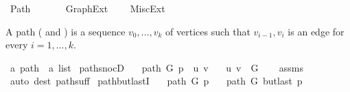 %
\begin{isabellebody}%
%
%
\isadelimtheory
%
\endisadelimtheory
%
\isatagtheory
{}\isamarkupfalse%
\ Path\isanewline
\ \ \isanewline
\ \ \ \ Graph{\isacharunderscore}{\kern0pt}Ext\isanewline
\ \ \ \ {\isachardoublequoteopen}{\isachardot}{\kern0pt}{\isachardot}{\kern0pt}{\isacharslash}{\kern0pt}{\isachardot}{\kern0pt}{\isachardot}{\kern0pt}{\isacharslash}{\kern0pt}Misc{\isacharunderscore}{\kern0pt}Ext{\isachardoublequoteclose}\isanewline
{}%
\endisatagtheory
{\isafoldtheory}%
%
\isadelimtheory
%
\endisadelimtheory
%
\begin{isamarkuptext}%
A path ( and ) is a sequence $v_0,\dots,v_k$ of vertices such that
${v_{i-1},v_i}$ is an edge for every $i=1,\dots,k$.%
\end{isamarkuptext}\isamarkuptrue%
\isamarkupfalse%
\ {\isacharprime}{\kern0pt}a\ path\ {\isacharequal}{\kern0pt}\ {\isachardoublequoteopen}{\isacharprime}{\kern0pt}a\ list{\isachardoublequoteclose}\isanewline
%
\isadeliminvisible
\isanewline
%
\endisadeliminvisible
%
\isataginvisible
{}\isamarkupfalse%
\ path{\isacharunderscore}{\kern0pt}snocD{\isacharcolon}{\kern0pt}\isanewline
\ \ \ {\isachardoublequoteopen}path\ G\ {\isacharparenleft}{\kern0pt}p\ {\isacharat}{\kern0pt}\ {\isacharbrackleft}{\kern0pt}u{\isacharcomma}{\kern0pt}\ v{\isacharbrackright}{\kern0pt}{\isacharparenright}{\kern0pt}{\isachardoublequoteclose}\isanewline
\ \ \ {\isachardoublequoteopen}{\isacharbraceleft}{\kern0pt}u{\isacharcomma}{\kern0pt}\ v{\isacharbraceright}{\kern0pt}\ {\isasymin}\ G{\isachardoublequoteclose}%
\endisataginvisible
{\isafoldinvisible}%
%
\isadeliminvisible
\isanewline
%
\endisadeliminvisible
%
\isadelimproof
\ \ %
\endisadelimproof
%
\isatagproof
{}\isamarkupfalse%
\ assms\isanewline
\ \ \isamarkupfalse%
\ {\isacharparenleft}{\kern0pt}auto\ dest{\isacharcolon}{\kern0pt}\ path{\isacharunderscore}{\kern0pt}suff{\isacharparenright}{\kern0pt}%
\endisatagproof
{\isafoldproof}%
%
\isadelimproof
\isanewline
%
\endisadelimproof
%
\isadeliminvisible
\isanewline
%
\endisadeliminvisible
%
\isataginvisible
{}\isamarkupfalse%
\ path{\isacharunderscore}{\kern0pt}butlastI{\isacharcolon}{\kern0pt}\isanewline
\ \ \ {\isachardoublequoteopen}path\ G\ p{\isachardoublequoteclose}\isanewline
\ \ \ {\isachardoublequoteopen}path\ G\ {\isacharparenleft}{\kern0pt}butlast\ p{\isacharparenright}{\kern0pt}{\isachardoublequoteclose}%

\end{isabellebody}
